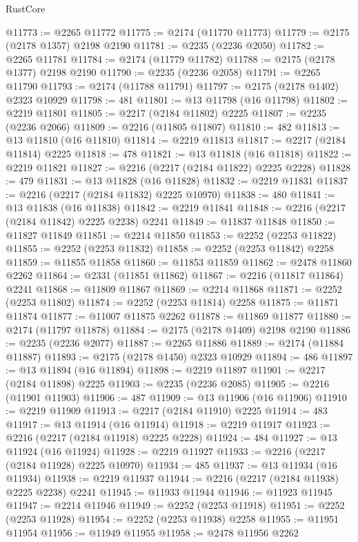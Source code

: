 \begin{lexlean}{RustCore}
\begin{coremodule}
@11773 := @2265 @11772
@11775 := @2174 (@11770 @11773)
@11779 := @2175 (@2178 @1357) @2198 @2190
@11781 := @2235 (@2236 @2050)
@11782 := @2265 @11781
@11784 := @2174 (@11779 @11782)
@11788 := @2175 (@2178 @1377) @2198 @2190
@11790 := @2235 (@2236 @2058)
@11791 := @2265 @11790
@11793 := @2174 (@11788 @11791)
@11797 := @2175 (@2178 @1402) @2323 @10929
@11798 := 481
@11801 := @13 @11798 (@16 @11798)
@11802 := @2219 @11801
@11805 := @2217 (@2184 @11802) @2225
@11807 := @2235 (@2236 @2066)
@11809 := @2216 (@11805 @11807)
@11810 := 482
@11813 := @13 @11810 (@16 @11810)
@11814 := @2219 @11813
@11817 := @2217 (@2184 @11814) @2225
@11818 := 478
@11821 := @13 @11818 (@16 @11818)
@11822 := @2219 @11821
@11827 := @2216 (@2217 (@2184 @11822) @2225 @2228)
@11828 := 479
@11831 := @13 @11828 (@16 @11828)
@11832 := @2219 @11831
@11837 := @2216 (@2217 (@2184 @11832) @2225 @10970)
@11838 := 480
@11841 := @13 @11838 (@16 @11838)
@11842 := @2219 @11841
@11848 := @2216 (@2217 (@2184 @11842) @2225 @2238) @2241
@11849 := @11837 @11848
@11850 := @11827 @11849
@11851 := @2214 @11850
@11853 := @2252 (@2253 @11822)
@11855 := @2252 (@2253 @11832)
@11858 := @2252 (@2253 @11842) @2258
@11859 := @11855 @11858
@11860 := @11853 @11859
@11862 := @2478 @11860 @2262
@11864 := @2331 (@11851 @11862)
@11867 := @2216 (@11817 @11864) @2241
@11868 := @11809 @11867
@11869 := @2214 @11868
@11871 := @2252 (@2253 @11802)
@11874 := @2252 (@2253 @11814) @2258
@11875 := @11871 @11874
@11877 := @11007 @11875 @2262
@11878 := @11869 @11877
@11880 := @2174 (@11797 @11878)
@11884 := @2175 (@2178 @1409) @2198 @2190
@11886 := @2235 (@2236 @2077)
@11887 := @2265 @11886
@11889 := @2174 (@11884 @11887)
@11893 := @2175 (@2178 @1450) @2323 @10929
@11894 := 486
@11897 := @13 @11894 (@16 @11894)
@11898 := @2219 @11897
@11901 := @2217 (@2184 @11898) @2225
@11903 := @2235 (@2236 @2085)
@11905 := @2216 (@11901 @11903)
@11906 := 487
@11909 := @13 @11906 (@16 @11906)
@11910 := @2219 @11909
@11913 := @2217 (@2184 @11910) @2225
@11914 := 483
@11917 := @13 @11914 (@16 @11914)
@11918 := @2219 @11917
@11923 := @2216 (@2217 (@2184 @11918) @2225 @2228)
@11924 := 484
@11927 := @13 @11924 (@16 @11924)
@11928 := @2219 @11927
@11933 := @2216 (@2217 (@2184 @11928) @2225 @10970)
@11934 := 485
@11937 := @13 @11934 (@16 @11934)
@11938 := @2219 @11937
@11944 := @2216 (@2217 (@2184 @11938) @2225 @2238) @2241
@11945 := @11933 @11944
@11946 := @11923 @11945
@11947 := @2214 @11946
@11949 := @2252 (@2253 @11918)
@11951 := @2252 (@2253 @11928)
@11954 := @2252 (@2253 @11938) @2258
@11955 := @11951 @11954
@11956 := @11949 @11955
@11958 := @2478 @11956 @2262

\end{coremodule}
\end{lexlean}

